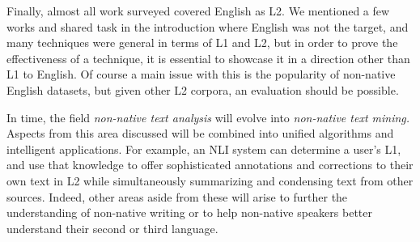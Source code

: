 Finally, almost all work surveyed covered English as L2. We mentioned a few
works and shared task in the introduction where English was not the target, and
many techniques were general in terms of L1 and L2, but in order to prove the
effectiveness of a technique, it is essential to showcase it in a direction
other than L1 to English. Of course a main issue with this is the popularity of
non-native English datasets, but given other L2 corpora, an evaluation should be
possible.

In time, the field \emph{non-native text analysis} will evolve into
\emph{non-native text mining.} Aspects from this area discussed will be combined
into unified algorithms and intelligent applications. For example, an NLI system
can determine a user's L1, and use that knowledge to offer sophisticated
annotations and corrections to their own text in L2 while simultaneously
summarizing and condensing text from other sources. Indeed, other areas aside
from these will arise to further the understanding of non-native writing or to
help non-native speakers better understand their second or third language.

